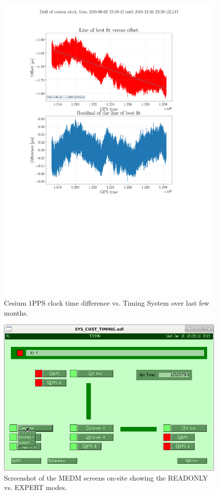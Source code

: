 \documentclass{article}
\begin{document}
\begin{figure}
  \includegraphics[width=\linewidth]{img/cesium-clock.png}
  \caption{Cesium 1PPS clock time difference vs. Timing System over last few months.}
  \label{fig:cesium}
\end{figure}
\begin{figure}
  \includegraphics[width=\linewidth]{img/2019-01-16_lho-timing-overview-medm.png}
  \caption{Screenshot of the MEDM screens on-site showing the READONLY vs. EXPERT modes.}
  \label{fig:medm-expert-vs-readonly}
\end{figure}
\end{document}
